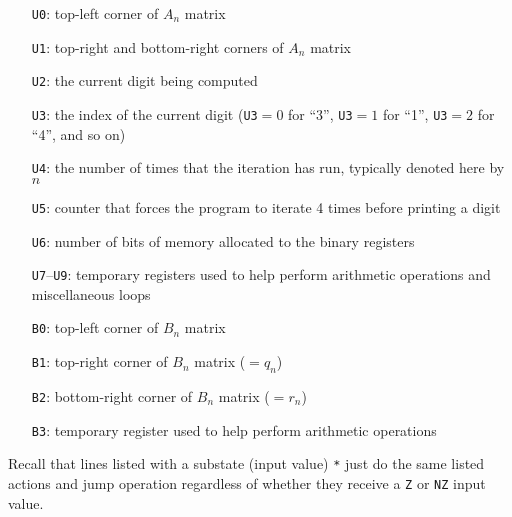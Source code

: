 \begin{itemize}
	\item[\texttt{U0}:] top-left corner of $A_n$ matrix
	
	\item[\texttt{U1}:] top-right and bottom-right corners of $A_n$ matrix
	
	\item[\texttt{U2}:] the current digit being computed
	
	\item[\texttt{U3}:] the index of the current digit (\texttt{U3}${} = 0$ for ``3'', \texttt{U3}${} = 1$ for ``1'', \texttt{U3}${} = 2$ for ``4'', and so on)
	
	\item[\texttt{U4}:] the number of times that the iteration has run, typically denoted here by $n$
	
	\item[\texttt{U5}:] counter that forces the program to iterate 4 times before printing a digit

	\item[\texttt{U6}:] number of bits of memory allocated to the binary registers
	
	\item[\texttt{U7}--\texttt{U9}:] temporary registers used to help perform arithmetic operations and miscellaneous loops\medskip
	
	\item[\texttt{B0}:] top-left corner of $B_n$ matrix
	
	\item[\texttt{B1}:] top-right corner of $B_n$ matrix ($= q_n$)
	
	\item[\texttt{B2}:] bottom-right corner of $B_n$ matrix ($= r_n$)
	
	\item[\texttt{B3}:] temporary register used to help perform arithmetic operations\medskip
\end{itemize}

Recall that lines listed with a substate (input value) \texttt{*} just do the same listed actions and jump operation regardless of whether they receive a \texttt{Z} or \texttt{NZ} input value.

